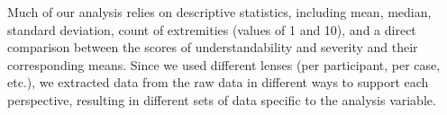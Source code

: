 
Much of our analysis relies on descriptive statistics, including mean, median, standard deviation, count of extremities (values of 1 and 10), and a direct comparison between the scores of understandability and severity and their corresponding means.
Since we used different lenses (per participant, per case, etc.), we extracted data from the raw data in different ways to support each perspective, resulting in different sets of data specific to the analysis variable.


